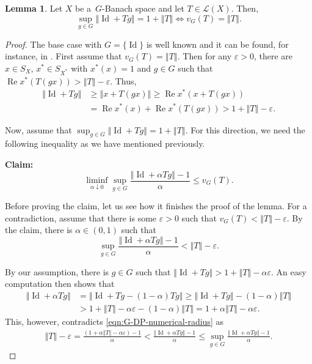 \documentclass[a4paper,12pt]{amsart}
\theoremstyle{definition}
\newtheorem{lemma}[theorem]{Lemma}
\theoremstyle{definition}
\theoremstyle{remark}
\numberwithin{equation}{section}
\DeclareMathOperator{\re}{Re}
\DeclareMathOperator{\id}{Id}
\newcommand{\<}{\langle}
\renewcommand{\>}{\rangle}
\newcommand{\norm}[1]{\left\Vert#1\right\Vert}
\newcommand{\e}{\varepsilon}
\newcommand{\eps}{\e}
\begin{document}
	\begin{lemma} \label{lem:G-DP-numerical-radius}
		Let $X$ be a~$G$-Banach space and let $T \in \mathcal{L}(X)$. Then,
		\begin{equation*}
			\sup_{g \in G} \norm{\id + Tg} = 1 + \norm{T} \iff v_G(T) = \norm{T}.
		\end{equation*}
	\end{lemma}
	\begin{proof}
		The base case with $G = \{\id\}$ is well known and it can be found, for instance, in \cite[Lemma 12.3.1]{KMRW}. First assume that $v_G(T) = \norm{T}$. Then for any $\eps > 0$, there are $x \in S_X$, $x^* \in S_{X^*}$ with $x^*(x) = 1$ and $g \in G$ such that $\re x^*(T(gx)) > \norm{T} - \eps$. Thus,
		\begin{align*}
			\norm{\id + Tg}
			&\ge \norm{x + T(gx)}
			\ge \re x^*(x + T(gx))\\
			&= \re x^*(x) + \re x^*(T(gx))
			> 1 + \norm{T} - \eps.
		\end{align*}
		
		Now, assume that $\sup_{g \in G} \norm{\id + Tg} = 1 + \norm{T}$. For this direction, we need the following inequality as we have mentioned previously.
		
		\noindent
		\textbf{Claim:}
		\begin{equation*}
			\liminf_{\alpha\downarrow 0} \sup_{g \in G} \frac{\norm{\id + \alpha Tg} - 1}{\alpha} \le v_G(T).
		\end{equation*}
		
		Before proving the claim, let us see how it finishes the proof of the lemma. For a contradiction, assume that there is some $\eps > 0$ such that $v_G(T) < \norm{T} - \eps$. By the claim, there is $\alpha \in (0,1)$ such that
		\begin{equation} \label{eqn:G-DP-numerical-radius}
			\sup_{g \in G} \frac{\norm{\id + \alpha Tg} - 1}{\alpha} < \norm{T} - \eps.
		\end{equation}
		
		By our assumption, there is $g \in G$ such that $\norm{\id + Tg} > 1 + \norm{T} - \alpha \eps$. An easy computation then shows that
		\begin{align*}
			\norm{\id + \alpha Tg}
			&= \norm{\id + Tg - (1-\alpha)Tg}
			\ge \norm{\id + Tg} - (1-\alpha)\norm{T}\\
			&> 1 + \norm{T} - \alpha \eps - (1-\alpha)\norm{T}
			= 1 + \alpha\norm{T} - \alpha \eps.
		\end{align*}
		This, however, contradicts \eqref{eqn:G-DP-numerical-radius} as
		\begin{align*}
			\norm{T} - \eps
			= \frac{(1 + \alpha\norm{T} - \alpha\eps) - 1}{\alpha}
			< \frac{\norm{\id + \alpha Tg} - 1}{\alpha}
			\le \sup_{g \in G} \frac{\norm{\id + \alpha Tg} - 1}{\alpha}.
		\end{align*}
		

\end{proof}
\end{document}
